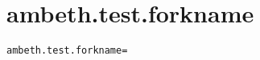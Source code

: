 \section{ambeth.test.forkname}
\label{configuration:AmbethTestForkname}
\ClearAPI
\TODO%
\begin{lstlisting}[style=Props,caption={Usage example for \textit{ambeth.test.forkname}}]
ambeth.test.forkname=
\end{lstlisting}